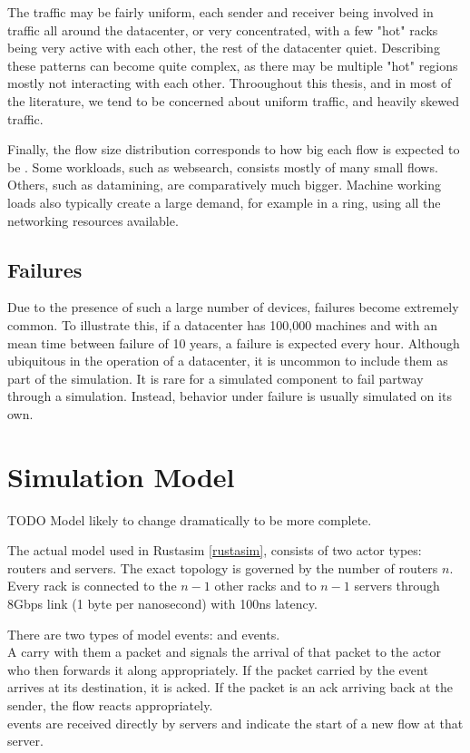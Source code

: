 The traffic may be fairly uniform, each sender and receiver being involved in traffic all around the datacenter, or very concentrated, with a few "hot" racks being very active with each other, the rest of the datacenter quiet.
Describing these patterns can become quite complex, as there may be multiple "hot" regions mostly not interacting with each other.
Throoughout this thesis, and in most of the literature, we tend to be concerned about uniform traffic, and heavily skewed traffic. %

Finally, the flow size distribution corresponds to how big each flow is expected to be \cite{alizadeh_data_2010}.
Some workloads, such as websearch, consists mostly of many small flows.
Others, such as datamining, are comparatively much bigger.
Machine working loads also typically create a large demand, for example in a ring, using all the networking resources available.

\subsection{Failures} \label{failures} %

Due to the presence of such a large number of devices, failures become extremely common. %
To illustrate this, if a datacenter has 100,000 machines and with an mean time between failure of 10 years, a failure is expected every hour.
Although ubiquitous in the operation of a datacenter, it is uncommon to include them as part of the simulation.
It is rare for a simulated component to fail partway through a simulation.
Instead, behavior under failure is usually simulated on its own.



\section{Simulation Model} \label{model-sim}

TODO Model likely to change dramatically to be more complete.

The actual model used in Rustasim \ref{rustasim}, consists of two actor types: routers and servers.
The exact topology is governed by the number of routers $n$.
Every rack is connected to the $n-1$ other racks and to $n-1$ servers through 8Gbps link (1 byte per nanosecond) with 100ns latency.

There are two types of model events:  and  events.\\
A  carry with them a packet and signals the arrival of that packet to the actor who then forwards it along appropriately.
If the packet carried by the event arrives at its destination, it is acked.
If the packet is an ack arriving back at the sender, the flow reacts appropriately.\\
 events are received directly by servers and indicate the start of a new flow at that server.

